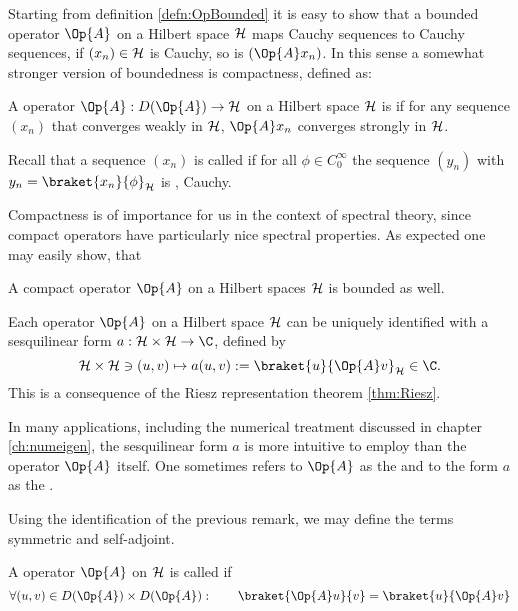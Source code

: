 Starting from definition \ref{defn:OpBounded}
it is easy to show that a bounded operator $\Op{A}$ on a Hilbert
space $\mathcal{H}$ maps Cauchy sequences to Cauchy sequences,
\ie if $(x_n) \in \mathcal{H}$ is Cauchy, so is $(\Op{A} x_n)$.
In this sense a somewhat stronger version of boundedness
is compactness, defined as:
\begin{defn}
	A operator $\Op{A} : D(\Op{A}) \to \hilbert$ on a Hilbert space $\mathcal{H}$
	is 
	if for any sequence $(x_n)$ that converges weakly in $\mathcal{H}$,
	$\Op{A} x_n$ converges strongly in $\mathcal{H}$.

	Recall that a sequence $(x_n)$ is called 
	if for all $\phi \in C^\infty_0$ the sequence $(y_n)$ with
	$y_n = \braket{x_n}{\phi}_\hilbert$
	is , \ie Cauchy.
\end{defn}
Compactness is of importance for us in the context of spectral theory,
since compact operators have particularly nice spectral properties.
As expected one may easily show, that~
\begin{prop}
	A compact operator $\Op{A}$ on a Hilbert spaces $\mathcal{H}$ is bounded as well.
\end{prop}

\begin{rem}
\label{rem:OpRietz}
Each operator $\Op{A}$ on a Hilbert space $\mathcal{H}$ can be
uniquely identified with a sesquilinear form
$a : \hilbert \times \hilbert \to \C$, defined by
\begin{equation}
	\hilbert \times \hilbert \ni (u, v) \mapsto a(u, v) := \braket{u}{\Op{A} v}_\hilbert \in \C.
	\label{eqn:formA}
\end{equation}
This is a consequence of the Riesz representation theorem \vref{thm:Riesz}.

In many applications, including the numerical treatment discussed in chapter
\vref{ch:numeigen},
the sesquilinear form $a$ is more intuitive to employ than the operator $\Op{A}$ itself.
One sometimes refers to $\Op{A}$ as the 
and to the form $a$ as the .
\end{rem}

Using the identification of the previous remark,
we may define the terms symmetric and self-adjoint.
\begin{defn}
	A operator $\Op{A}$ on $\mathcal{H}$ is called  if
	\[ \forall (u, v) \in D(\Op{A}) \times D(\Op{A}): \qquad \braket{\Op{A} u}{v} = \braket{u}{\Op{A} v} \]
\end{defn}

